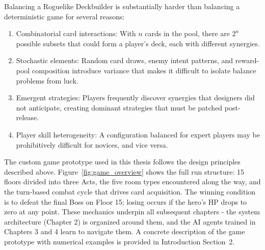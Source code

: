 Balancing a Roguelike Deckbuilder is substantially harder than balancing a deterministic game for several reasons:
\begin{enumerate}
    \item Combinatorial card interactions: With $n$ cards in the pool, there are $2^n$ possible subsets that could form a player's deck, each with different synergies.
    \item Stochastic elements: Random card draws, enemy intent patterns, and reward-pool composition introduce variance that makes it difficult to isolate balance problems from luck.
    \item Emergent strategies: Players frequently discover synergies that designers did not anticipate, creating dominant strategies that must be patched post-release.
    \item Player skill heterogeneity: A configuration balanced for expert players may be prohibitively difficult for novices, and vice versa.
\end{enumerate}

The custom game prototype used in this thesis follows the design principles described above. Figure~\ref{fig:game_overview} shows the full run structure: 15 floors divided into three Acts, the five room types encountered along the way, and the turn-based combat cycle that drives card acquisition. The winning condition is to defeat the final Boss on Floor 15; losing occurs if the hero's HP drops to zero at any point. These mechanics underpin all subsequent chapters - the system architecture (Chapter 2) is organized around them, and the AI agents trained in Chapters 3 and 4 learn to navigate them. A concrete description of the game prototype with numerical examples is provided in Introduction Section~2.

